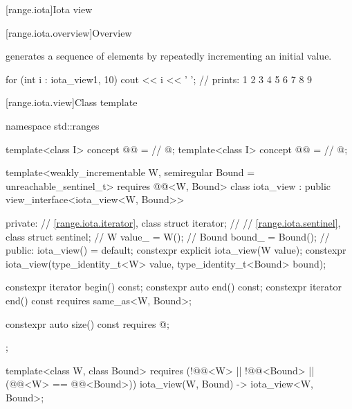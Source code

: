 [range.iota]{Iota view}

[range.iota.overview]{Overview}

\pnum
{} generates a
sequence of elements by repeatedly incrementing an initial value.

\pnum
\begin{example}
\begin{codeblock}
for (int i : iota_view{1, 10})
  cout << i << ' '; // prints: 1 2 3 4 5 6 7 8 9
\end{codeblock}
\end{example}

[range.iota.view]{Class template }

%
\begin{codeblock}
namespace std::ranges {
  template<class I>
    concept @@ =     // \expos
      @\seebelow@;
  template<class I>
    concept @@ =       // \expos
      @\seebelow@;

  template<weakly_incrementable W, semiregular Bound = unreachable_sentinel_t>
    requires @@<W, Bound>
  class iota_view : public view_interface<iota_view<W, Bound>> {
  private:
    // \ref{range.iota.iterator}, class 
    struct iterator;            // \expos
    // \ref{range.iota.sentinel}, class 
    struct sentinel;            // \expos
    W value_ = W();             // \expos
    Bound bound_ = Bound();     // \expos
  public:
    iota_view() = default;
    constexpr explicit iota_view(W value);
    constexpr iota_view(type_identity_t<W> value,
                        type_identity_t<Bound> bound);

    constexpr iterator begin() const;
    constexpr auto end() const;
    constexpr iterator end() const requires same_as<W, Bound>;

    constexpr auto size() const requires @\seebelow@;
  };

  template<class W, class Bound>
    requires (!@@<W> || !@@<Bound> ||
      (@@<W> == @@<Bound>))
    iota_view(W, Bound) -> iota_view<W, Bound>;
}
\end{codeblock}

